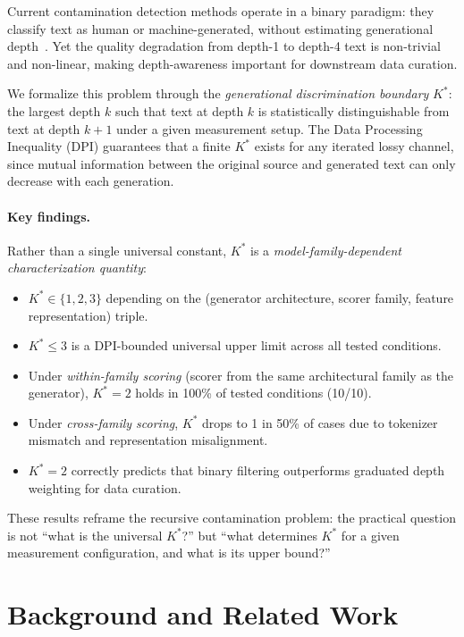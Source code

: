 \documentclass[11pt,a4paper]{article}
\newcommand{\kstar}{K^{*}}
\begin{document}
Current contamination detection methods operate in a binary paradigm: they classify text as human or machine-generated, without estimating generational depth~\cite{mitchell2023detectgpt,hans2024spotting}.
Yet the quality degradation from depth-1 to depth-4 text is non-trivial and non-linear, making depth-awareness important for downstream data curation.

We formalize this problem through the \emph{generational discrimination boundary} $\kstar$: the largest depth $k$ such that text at depth $k$ is statistically distinguishable from text at depth $k{+}1$ under a given measurement setup.
The Data Processing Inequality (DPI) guarantees that a finite $\kstar$ exists for any iterated lossy channel, since mutual information between the original source and generated text can only decrease with each generation.

\paragraph{Key findings.}
Rather than a single universal constant, $\kstar$ is a \emph{model-family-dependent characterization quantity}:
\begin{itemize}
    \item $\kstar \in \{1, 2, 3\}$ depending on the (generator architecture, scorer family, feature representation) triple.
    \item $\kstar \leq 3$ is a DPI-bounded universal upper limit across all tested conditions.
    \item Under \emph{within-family scoring} (scorer from the same architectural family as the generator), $\kstar = 2$ holds in 100\% of tested conditions (10/10).
    \item Under \emph{cross-family scoring}, $\kstar$ drops to 1 in 50\% of cases due to tokenizer mismatch and representation misalignment.
    \item $\kstar = 2$ correctly predicts that binary filtering outperforms graduated depth weighting for data curation.
\end{itemize}

These results reframe the recursive contamination problem: the practical question is not ``what is the universal $\kstar$?'' but ``what determines $\kstar$ for a given measurement configuration, and what is its upper bound?''

\section{Background and Related Work}
\label{sec:related}
\end{document}
